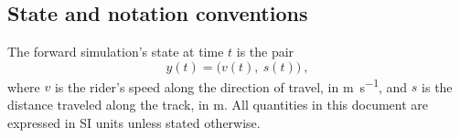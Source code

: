 \subsection*{State and notation conventions}

The forward simulation's state at time $t$ is the pair
\begin{equation}
    y(t) = \bigl(v(t),\ s(t)\bigr)\ ,
    \label{eq:state-vector}
\end{equation}
where $v$ is the rider's speed along the direction of travel, in
\si{\metre\per\second}, and $s$ is the distance traveled along the track, in
\si{\metre}. All quantities in this document are expressed in SI units unless
stated otherwise.
